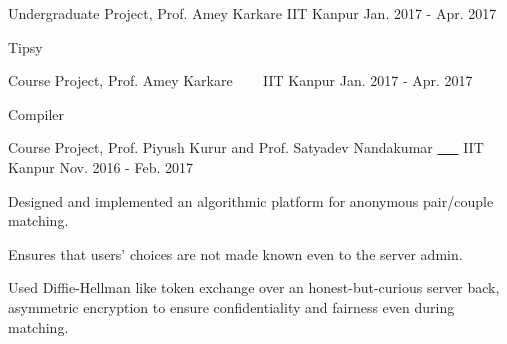 


\begin{cventries}

  \cventry
  {Undergraduate Project, Prof. Amey Karkare}
  {{}
    {}}
  {IIT Kanpur}
  {Jan. 2017 - Apr. 2017}
  {
    \begin{cvitems}
    \item Tipsy
    \end{cvitems}
  }

  \cventry
  {Course Project, Prof. Amey Karkare}
  {\href{https://github.com/pallavagarwal07/amigo.git}{}
    \ \ \ \normalfont\href{https://github.com/pallavagarwal07/amigo}
    {}}
  {IIT Kanpur}
  {Jan. 2017 - Apr. 2017}
  {
    \begin{cvitems}
    \item Compiler
    \end{cvitems}
  }

  \cventry
  {Course Project, Prof. Piyush Kurur and
    Prof. Satyadev Nandakumar}
  {\href{https://github.com/pclubiitk/puppy-love}{
      \ \ \ }}
  {IIT Kanpur}
  {Nov. 2016 - Feb. 2017}
  {
    \begin{cvitems}
      \item Designed and implemented an algorithmic platform
        for anonymous pair/couple matching.
      \item Ensures that users' choices are not made known even to the
        server admin.
      \item Used Diffie-Hellman like token exchange over an
        honest-but-curious server back, asymmetric encryption to
        ensure confidentiality and fairness even during matching.
    \end{cvitems}
  }


\end{cventries}
